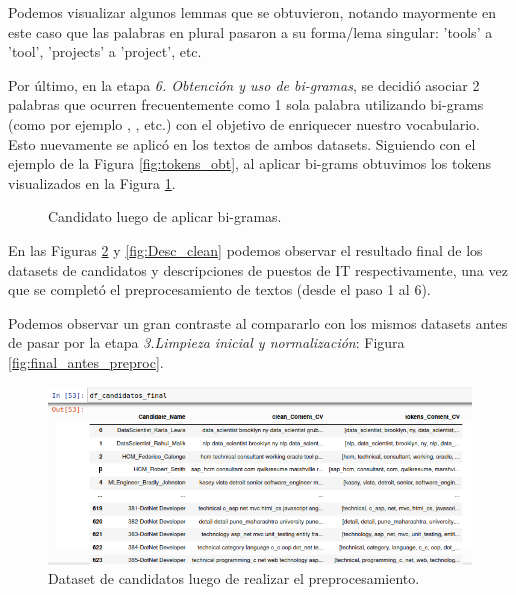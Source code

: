 \documentclass[12pt,a4paper]{article}
\begin{document}
\begin{sloppypar}
Podemos visualizar algunos lemmas que se obtuvieron, notando mayormente en este caso que las palabras en plural pasaron a su forma/lema singular: 'tools' a 'tool', 'projects' a 'project', etc.

Por último, en la etapa \textit{6. Obtención y uso de bi-gramas}, se decidió asociar 2 palabras que ocurren frecuentemente como 1 sola palabra utilizando bi-grams (como por ejemplo , , etc.) con el objetivo de enriquecer nuestro vocabulario. Esto nuevamente se aplicó en los textos de ambos datasets. Siguiendo con el ejemplo de la Figura \ref{fig:tokens_obt}, al aplicar bi-grams obtuvimos los tokens visualizados en la Figura \ref{fig:bigrams_obt}.

\begin{figure}[H] 
 \centering
 \noindent{}
 \caption{Candidato luego de aplicar bi-gramas.} 
 \label{fig:bigrams_obt}
\end{figure}

En las Figuras \ref{fig:Cand_clean} y \ref{fig:Desc_clean} podemos observar el resultado final de los datasets de candidatos y descripciones de puestos de IT respectivamente, una vez que se completó el preprocesamiento de textos (desde el paso 1 al 6).

Podemos observar un gran contraste al compararlo con los mismos datasets antes de pasar por la etapa \textit{3.Limpieza inicial y normalización}: Figura \ref{fig:final_antes_preproc}.

\begin{figure}[H]    
 \centering
 \includegraphics[width=1\textwidth]{images/Implementacion/8-DS_Cand_Clean.png}
 \captionsetup{justification=centering,margin=3cm}
 \caption{Dataset de candidatos luego de realizar el preprocesamiento.}
 \label{fig:Cand_clean}
\end{figure}


\end{sloppypar}
\end{document}
